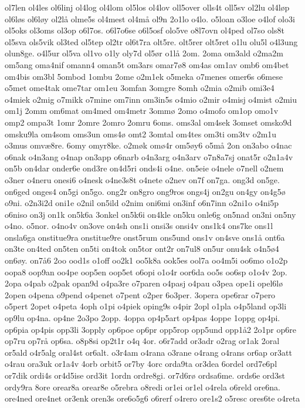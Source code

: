 {ol7len
ol4les
ol6linj
ol4log
ol4lom
ol5los
ol4lov
oll5over
olls4t
oll5sv
ol2lu
ol4løp
ol6løs
ol6løy
ol2lå
olme5s
ol4mest
ol4må
ol9n
2o1lo
o4lo.
o5loan
o3loe
o4lof
olo3i
ol5oks
ol3oms
ol3op
o6l7os.
o6l7o6se
o6l5osf
olo5ve
o8l7ovn
ol4ped
ol7so
ols8t
ol5sva
ols5vik
ol3ted
ol5tep
ol2tr
ol6t7ra
olt5re.
olt5rer
olt5ret
o1lu
olu5l
o4l3ung
olun8ge.
o4l5ur
ol5va
ol1vo
o1ly
oly7d
ol5ør
o1lå
2om.
2oma
om3ald
o2ma2m
om5ang
oma4nif
omann4
oman5t
om3ars
omar7ø8
om4as
om1av
omb6
om4bet
om4bis
om3bl
5ombod
1ombu
2ome
o2m1ek
o5meka
o7menes
omer6s
o6mese
o5met
ome4tak
ome7tar
om1eu
3omfan
3omgre
8omh
o2mia
o2mib
omi3e4
o4miek
o2mig
o7mikk
o7mine
om7inn
om3in5s
o4mio
o2mir
o4misj
o4mist
o2miu
om1j
2omm
om6mat
om4med
om4metr
3ommø
2omo
o4mofo
om1op
omo1v
omp2
ompa3t
1omr
2omre
2omro
2omru
6oms.
oms3al
om4sek
3omset
omsko9d
omsku9la
om4som
oms3un
oms4ø
omt2
3omtal
om4tes
om3ti
om3tv
o2m1u
o3mus
omvæ8re.
6omy
omyr8ke.
o2møk
omø4r
om5øy6
o5må
2on
on3abo
o4nac
o6nak
o4n3ang
o4nap
on3app
o6narb
o4n3arg
o4n3arv
o7n8a7sj
onat5r
o2n1a4v
on5b
on4dar
onder6e
ond3re
on4d5ri
onds4i
o4ne.
on5eie
o4nele
o7nell
o2nem
o3ner
o4neru
onesi6
o4nesk
o4ne3s8t
o4nete
o2nev
on7f
on7ga.
ong3d
on5ge.
on6ged
onges4
on5gi
on5go.
ong2r
on8gro
ong9ros
ongs4j
on2gu
on4gy
on4g5ø
o9ni.
o2n3i2d
oni1e
o2nil
on5ild
o2nim
oni6mi
on3inf
o6n7inn
o2ni1o
o4ni5p
o6niso
on3j
on1k
on5k6a
3onkel
on5k6i
on4kle
on5ku
onle6g
on5nad
on3ni
on5ny
o4no.
o5nor.
o4no4v
on3ove
on4sh
ons1i
onsi3s
onsi4v
ons1k4
ons7ke
ons1l
onsla6ga
onstitue9ra
onstitue9re
onst5rum
ons5und
ons1v
on4sve
ons1å
ont6a
on3te
on4ted
on5ten
on5ti
on4tok
on5tor
ont2r
on7ul8
on5ur
onu4sk
o4n5ø4
on6øy.
on7å6
2oo
ood1s
o1off
oo2k1
oo5k8a
ook5es
ool7a
oo4m5i
oo6mo
o1o2p
oopa8
oop9an
oo4pe
oop5en
oop5et
o6opi
o1o4r
oor6da
oo5s
oo6sp
o1o4v
2op.
2opa
o4pab
o2pak
opan9d
o4pa3re
o7paren
o4pasj
o4pau
o3pea
ope1i
opel6lø
2open
o4pena
o9pend
o4penet
o7pent
o2per
6o3per.
3opera
ope6rar
o7pero
o5pert
2opet
o4peta
4oph
o1pi
o4piek
oping9s
o4pir
2opl
o1pla
o4p5land
op3li
op9lu
op4na.
op4ne
2o3po
2opp.
4oppa
op4p5art
op4pas
4oppe
1oppg
op4pi.
op6pia
op4pis
opp3li
3opply
op6poe
op6pr
opp5rop
opp5und
opp1å2
2o1pr
op6re
op7ru
op7rå
op6sa.
o8p8si
op2t1r
o4q
4or.
o6r7add
or3adr
o2rag
or1ak
2oral
or5ald
o4r5alg
oral4st
or6alt.
o3r4am
o4rana
o3rane
o4rang
o4rans
or6ap
or3att
o4rau
ora3uk
or1a4v
4orb
orbit5
or7by
4orc
orda9ta
or3dea
6ordel
ord7e6pl
or7dik
ordi4s
or4d5ise
ord3it
1ordn
ordre8gi.
or7d6rø
ordsa6me.
ords6e
ord3st
ordy9ra
8ore
orear8a
orear8e
o5rebra
o8redi
or1ei
or1el
o4rela
o6reld
ore6na.
ore4ned
ore4net
or3enk
oren3s
ore6o5g6
o6rerf
o4rero
ore1s2
o5resc
ores6te
o4reta
}
